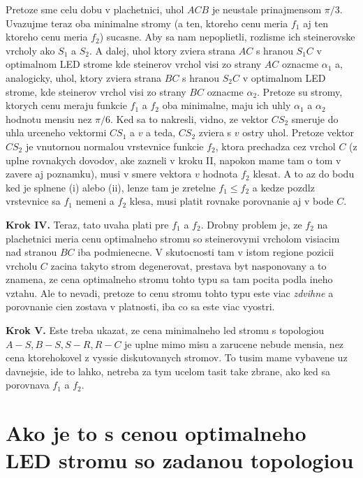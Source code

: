 \documentclass[12pt]{book}
\begin{document}
Pretoze sme celu dobu v plachetnici, uhol $ACB$ je neustale prinajmensom
    $\pi/3$. 
Uvazujme teraz oba minimalne stromy (a ten, ktoreho cenu meria $f_{1}$ aj ten
    ktoreho cenu meria $f_{2}$) sucasne.
Aby sa nam nepoplietli, rozlisme ich steinerovske vrcholy ako $S_{1}$ a
    $S_{2}$.
A dalej, uhol ktory zviera strana $AC$ s hranou $S_{1}C$ v optimalnom LED
    strome kde steinerov vrchol visi zo strany $AC$ oznacme $\alpha_{1}$
    a, analogicky, uhol, ktory zviera strana $BC$ s hranou $S_{2}C$ v
    optimalnom LED strome, kde steinerov vrchol visi zo strany $BC$ oznacme
    $\alpha_{2}$.
Pretoze su stromy, ktorych cenu meraju funkcie $f_{1}$ a $f_{2}$ oba minimalne,
    maju ich uhly $\alpha_{1}$ a $\alpha_{2}$ hodnotu mensiu nez $\pi/6$.
Ked sa to nakresli, vidno, ze vektor $CS_{2}$ smeruje do uhla urceneho vektormi
    $CS_{1}$ a $v$ a teda, $CS_{2}$ zviera s $v$ ostry uhol.
Pretoze vektor $CS_{2}$ je vnutornou normalou vrstevnice funkcie $f_{2}$, ktora
    prechadza cez vrchol $C$ (z uplne rovnakych dovodov, ake zazneli v kroku
    II, napokon mame tam o tom v zavere aj poznamku), musi v smere vektora $v$
    hodnota $f_{2}$ klesat.
A to az do bodu ked je splnene (i) alebo (ii), lenze tam je zretelne
    $f_{1}\le f_{2}$ a kedze pozdlz vrstevnice sa $f_{1}$ nemeni a $f_{2}$
    klesa, musi platit rovnake porovnanie aj v bode $C$.

{\bf Krok IV.}
Teraz, tato uvaha plati pre $f_{1}$ a $f_{2}$.
Drobny problem je, ze $f_{2}$ na plachetnici meria cenu optimalneho stromu
    so steinerovymi vrcholom visiacim nad stranou $BC$ iba podmienecne.
V skutocnosti tam v istom regione pozicii vrcholu $C$ zacina takyto strom
    degenerovat, prestava byt nasponovany a to znamena, ze cena optimalneho
    stromu tohto typu sa tam pocita podla ineho vztahu.
Ale to nevadi, pretoze to cenu stromu tohto typu este viac \emph{zdvihne}
    a porovnanie cien zostava v platnosti, iba co sa este viac vyostri.

{\bf Krok V.}
Este treba ukazat, ze cena minimalneho led stromu s topologiou
    $A-S,B-S,S-R,R-C$ je uplne mimo misu a zarucene nebude mensia, nez cena
    ktorehokovel z vyssie diskutovanych stromov.
To tusim mame vybavene uz davnejsie, ide to lahko, netreba za tym ucelom tasit
    take zbrane, ako ked sa porovnava $f_{1}$ a $f_{2}$.

\section{Ako je to s cenou optimalneho LED stromu so zadanou topologiou}
\end{document}
